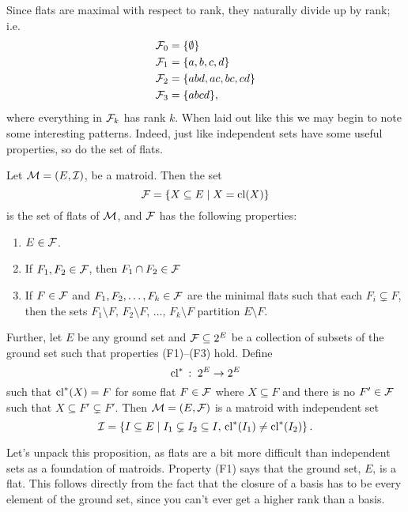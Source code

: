 \documentclass[12pt,oneside]{../../sfsuthesis}
\begin{document}
Since flats are maximal with respect to rank, they naturally divide up by rank; i.e.
\begin{align*}
    \mathcal{F}_0 & = \{ \emptyset \}       \\
    \mathcal{F}_1 & = \{ a, b, c, d \}      \\
    \mathcal{F}_2 & = \{ abd, ac, bc, cd \} \\
    \mathcal{F}_3 & = \{ abcd\},            \\
\end{align*}
where everything in \( \mathcal{F}_k \) has rank \( k \).
When laid out like this we may begin to note some interesting patterns.
Indeed, just like independent sets have some useful properties, so do the set of flats.

\begin{proposition}\th\label{prop:matroidFlatAxioms}
    Let \( \mathcal{M} = (E, \mathcal{I}) \), be a matroid.
    Then the set
    \[
        \mathcal{F} = \{ X \subseteq E \; | \; X = \operatorname{cl}(X) \}
    \]
    is the set of flats of \( \mathcal{M} \), and \( \mathcal{F} \) has the following properties:
    \begin{enumerate}[label=(F\arabic*)]
        \item \( E \in \mathcal{F} \).\label{def:F1}
        \item If \(F_1, F_2 \in \mathcal{F}\), then \( F_1 \cap F_2 \in \mathcal{F} \)\label{def:F2}
        \item If \( F \in \mathcal{F} \) and \(F_1, F_2, \dots , F_k \in \mathcal{F} \) are the minimal flats such that each \( F_i \subsetneq F \),
              then the sets \( F_1 \setminus F,\, F_2 \setminus F,\, \dots,\, F_k \setminus F \) partition \( E \setminus F \).\label{def:F3}
    \end{enumerate}

    Further, let \( E \) be any ground set and \( \mathcal{F} \subseteq 2^{E} \) be a collection of subsets of the ground set such that properties (F1)--(F3) hold.
    Define
    \[
        \operatorname{cl}^\ast \, : \; 2^E \to 2^E
    \]
    such that \( \operatorname{cl}^\ast(X) = F \) for some flat \( F \in \mathcal{F} \) where \( X \subseteq F \) and there is no \( F' \in \mathcal{F} \) such that \( X \subseteq F' \subsetneq F' \).
    Then \( \mathcal{M} = (E, \mathcal{F}) \) is a matroid with independent set
    \[
        \mathcal{I} = \left\{ I \subseteq E \; \middle| \; I_1 \subsetneq I_2 \subseteq I, \, \operatorname{cl}^\ast(I_1) \neq \operatorname{cl}^\ast(I_2)\right\}.
    \]


\end{proposition}

Let's unpack this proposition, as flats are a bit more difficult than independent sets as a foundation of matroids.
Property (F1) says that the ground set, \( E \), is a flat.
This follows directly from the fact that the closure of a basis has to be every element of the ground set, since you can't ever get a higher rank than a basis.
\end{document}
